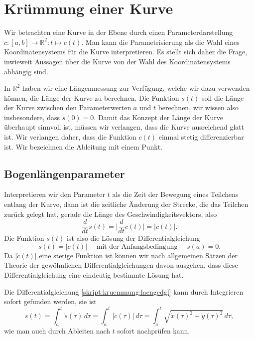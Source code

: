 %
%
%
\section{Krümmung einer Kurve
\label{skript:kruemmung:section:kurve}}
Wir betrachten eine Kurve in der Ebene durch einen Parameterdarstellung
$c\colon [a,b] \to\mathbb R^2:t\mapsto c(t)$.
Man kann die Parametrisierung als die Wahl eines Koordinatensystems
für die Kurve interpretieren.
Es stellt sich daher die Frage, inwieweit Aussagen über die Kurve von
der Wahl des Koordinatensystems abhängig sind.

In $\mathbb R^2$ haben wir eine Längenmessung zur Verfügung, welche
wir dazu verwenden können, die Länge der Kurve zu berechnen.
Die Funktion $s(t)$ soll die Länge der Kurve zwischen den Parameterwerten
$a$ und $t$ berechnen, wir wissen also insbesondere, dass $s(0)=0$.
Damit das Konzept der Länge der Kurve überhaupt sinnvoll ist, müssen
wir verlangen, dass die Kurve ausreichend glatt ist.
Wir verlangen daher, dass die Funktion $c(t)$ einmal stetig differenzierbar
ist.
Wir bezeichnen die Ableitung mit einem Punkt.

\subsection{Bogenlängenparameter}
Interpretieren wir den Parameter $t$ als die Zeit der Bewegung eines 
Teilchens entlang der Kurve, dann ist die zeitliche Änderung der Strecke,
die das Teilchen zurück gelegt hat, gerade die Länge des
Geschwindigkeitsvektors, also
\[
\frac{d}{dt} s(t) = \biggl|\frac{d}{dt}c(t)\biggr| = |\dot c(t)|.
\]
Die Funktion $s(t)$ ist also die Lösung der Differentialgleichung
\begin{equation}
\dot s(t)=|\dot c(t)|
\quad
\text{ mit der Anfangsbedingung }\quad s(a)=0.
\label{skript:kruemmung:laengedgl}
\end{equation}
Da $|\dot c(t)|$ eine stetige Funktion ist können wir nach allgemeinen
Sätzen der Theorie der gewöhnlichen Differentialgleichungen davon ausgehen,
dass diese Differentialgleichung eine eindeutig bestimmte Lösung hat.

Die Differentialgleichung \eqref{skript:kruemmung:laengedgl} kann 
durch Integrieren sofort gefunden werden, sie ist
\begin{equation}
s(t)
=
\int_a^t \dot s(\tau)\,d\tau
=
\int_a^t |\dot c(\tau)| \,d\tau
=
\int_a^t \sqrt{\dot x(\tau)^2 + \dot y(\tau)^2}\,d\tau,
\label{skript:kruemmung:laenge}
\end{equation}
wie man auch durch Ableiten nach $t$ sofort nachprüfen kann.

